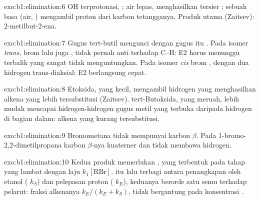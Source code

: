 \begin{solution}{exo:b1:elimination:6}
OH terprotonasi, ; air lepas, menghasilkan  tersier
; sebuah basa (air, ) mengambil proton dari
karbon tetangganya. Produk utama (Zaitsev): 2-metilbut-2-ena.
\end{solution}

\begin{solution}{exo:b1:elimination:7}
Gugus tert-butil mengunci  dengan gugus itu . Pada isomer
\textit{trans}, brom lalu juga , tidak pernah anti terhadap
C--H: E2 harus menunggu  terbalik yang sangat tidak menguntungkan.
Pada isomer \textit{cis} brom , dengan dua hidrogen trans-diaksial:
E2 berlangsung cepat.
\end{solution}

\begin{solution}{exo:b1:elimination:8}
Etoksida, yang kecil, mengambil hidrogen yang menghasilkan alkena yang
lebih tersubstitusi (Zaitsev). tert-Butoksida, yang meruah, lebih mudah
mencapai hidrogen-hidrogen gugus metil yang terbuka daripada hidrogen
 di bagian dalam: alkena yang kurang tersubstitusi.
\end{solution}

\begin{solution}{exo:b1:elimination:9}
Bromometana tidak mempunyai karbon $\beta$. Pada 1-bromo-2,2-dimetilpropana
karbon $\beta$-nya kuaterner dan tidak membawa hidrogen.
\end{solution}

\begin{solution}{exo:b1:elimination:10}
Kedua produk memerlukan , yang terbentuk pada tahap yang lambat
dengan laju $k_1[\mathrm{RBr}]$.  itu lalu terbagi antara
penangkapan oleh etanol ( $k_S$) dan pelepasan proton
( $k_E$), keduanya berorde satu semu terhadap pelarut: fraksi
alkenanya $k_E/(k_E + k_S)$, tidak bergantung pada konsentrasi .
\end{solution}


